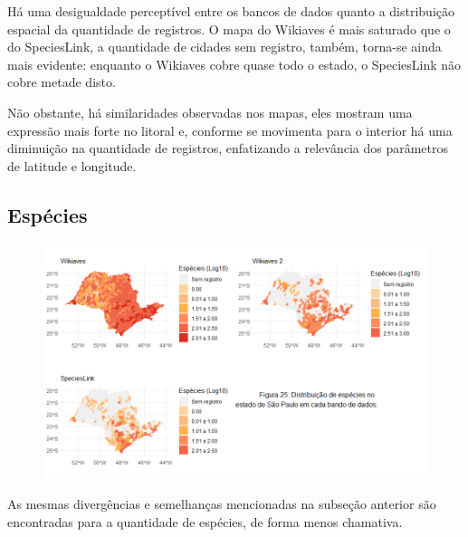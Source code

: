 \begin{resposta}
Há uma desigualdade perceptível entre os bancos de dados quanto a distribuição espacial da quantidade de registros. O mapa do Wikiaves é mais saturado que o do SpeciesLink, a quantidade de cidades sem registro, também, torna-se ainda mais evidente: enquanto o Wikiaves cobre quase todo o estado, o SpeciesLink não cobre metade disto. 

Não obstante, há similaridades observadas nos mapas, eles mostram uma expressão mais forte no litoral e, conforme se movimenta para  o interior há uma diminuição na quantidade de registros, enfatizando a relevância dos parâmetros de latitude e longitude.
\end{resposta}

\subsection {Espécies}

\begin{figure}[h!]
\centering
\includegraphics[width=17cm]{Imagens/M05.png}
\end{figure}

\begin{resposta}
As mesmas divergências e semelhanças mencionadas na subseção anterior são encontradas para a quantidade de espécies, de forma menos chamativa. 
\end{resposta}
